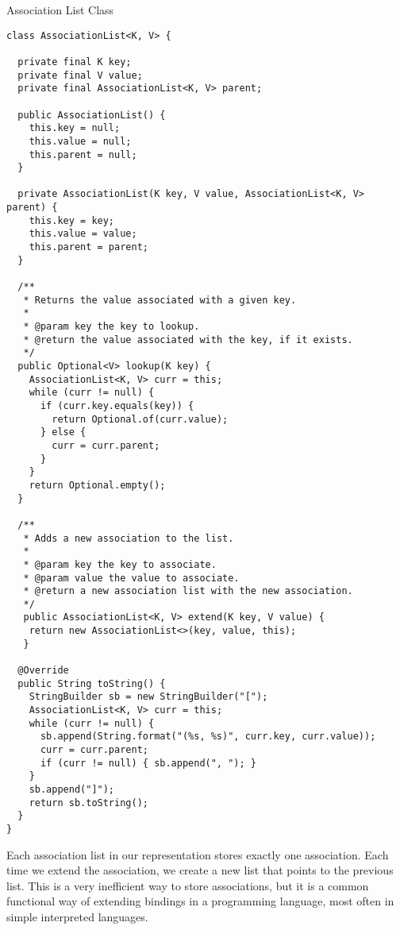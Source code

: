 \begin{cl}{Association List Class}
\begin{lstlisting}[language=MyJava]
class AssociationList<K, V> {
  
  private final K key;
  private final V value;
  private final AssociationList<K, V> parent;
  
  public AssociationList() {
    this.key = null;
    this.value = null;
    this.parent = null;
  }

  private AssociationList(K key, V value, AssociationList<K, V> parent) {
    this.key = key;
    this.value = value;
    this.parent = parent;
  }
  
  /**
   * Returns the value associated with a given key.
   * 
   * @param key the key to lookup.
   * @return the value associated with the key, if it exists.
   */
  public Optional<V> lookup(K key) {
    AssociationList<K, V> curr = this;
    while (curr != null) {
      if (curr.key.equals(key)) {
        return Optional.of(curr.value);
      } else {
        curr = curr.parent;
      }
    }
    return Optional.empty();
  }
  
  /**
   * Adds a new association to the list.
   * 
   * @param key the key to associate.
   * @param value the value to associate.
   * @return a new association list with the new association.
   */
   public AssociationList<K, V> extend(K key, V value) {
    return new AssociationList<>(key, value, this);
   }
  
  @Override
  public String toString() {
    StringBuilder sb = new StringBuilder("[");
    AssociationList<K, V> curr = this;
    while (curr != null) {
      sb.append(String.format("(%s, %s)", curr.key, curr.value));
      curr = curr.parent;
      if (curr != null) { sb.append(", "); }
    }
    sb.append("]");
    return sb.toString();
  }
}
\end{lstlisting}
\end{cl}

Each association list in our representation stores exactly one association. Each time we extend the association, we create a new list that points to the previous list. This is a very inefficient way to store associations, but it is a common functional way of extending bindings in a programming language, most often in simple interpreted languages.